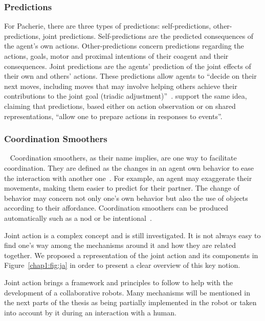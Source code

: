 \documentclass[a4paper,11pt,twoside]{StyleThese}
\begin{document}
\subsubsection{Predictions}\label{chap1:subsubsec:pred}
For Pacherie, there are three types of predictions: self-predictions, other-predictions, joint predictions. Self-predictions are the predicted consequences of the agent's own actions. Other-predictions concern predictions regarding the actions, goals, motor and proximal intentions of their coagent and their consequences. Joint predictions are the agents' prediction of the joint effects of their own and others' actions. These predictions allow agents to ``decide on their next moves, including moves that may involve helping others achieve their contributions to the joint goal (triadic adjustment)''~\citep[pp.~354-355]{pacherie_2012_agency}. \cite[p.~73]{sebanz_2006_joint} support the same idea, claiming that predictions, based either on action observation or on shared representations, ``allow one to prepare actions in responses to events''.

\subsubsection{Coordination Smoothers}~\label{chap1:subsubsec:coord_smooth}
Coordination smoothers, as their name implies, are one way to facilitate coordination. They are defined as the changes in an agent own behavior to ease the interaction with another one~\citep{vesper_2010_minimal}. For example, an agent may exaggerate their movements, making them easier to predict for their partner. The change of behavior may concern not only one's own behavior but also the use of objects according to their affordance. Coordination smoothers can be produced automatically such as a nod or be intentional~\citep{michael_2015_commitments}.

\bigskip

Joint action is a complex concept and is still investigated. It is not always easy to find one's way among the mechanisms around it and how they are related together. We proposed a representation of the joint action and its components in Figure~\ref{chap1:fig:ja} in order to present a clear overview of this key notion. 

Joint action brings a framework and principles to follow to help with the development of a collaborative robots. Many mechanisms will be mentioned in the next parts of the thesis as being partially implemented in the robot or taken into account by it during an interaction with a human.
\end{document}
